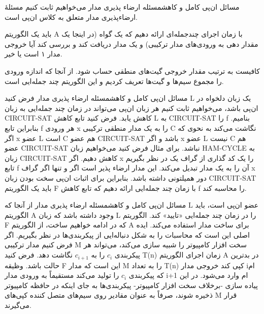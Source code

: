 \begin{itemframe-s}{مسائل ان‌پی کامل و کاهش}{مسئله ارضاء پذیری مدار}
\itm
می‌خواهیم ثابت کنیم مسئلهٔ ارضاء‌پذیری مدار متعلق به کلاس ان‌پی است.

\itm
باید یک الگوریتم A با زمان اجرای چندجمله‌ای ارائه ‌دهیم که یک گواه (در اینجا یک مقدار دهی به ورودی‌های مدار ترکیبی) و یک مدار دریافت کند و بررسی کند آیا خروجی مدار ۱ است یا خیر.

\itm
کافیست به ترتیب مقدار خروجی گیت‌های منطقی حساب شود. از آنجا که اندازه ورودی را مجموع سیم‌ها و گیت‌ها تعریف کردیم و این الگوریتم چند جمله‌ایی است.
\end{itemframe-s}

\begin{itemframe-s}{مسائل ان‌پی کامل و کاهش}{مسئله ارضاء پذیری مدار}
\itm
فرض کنید L یک زبان دلخواه در ان‌پی باشد، می‌خواهیم ثابت کنیم هر زبان ان‌پی می‌تواند در زمان چند جمله‌ایی به زبان CIRCUIT-SAT کاهش یابد. فرض کنید تابع کاهش L به CIRCUIT-SAT را f بنامیم.
\itm
بنابراین تابع f هر ورودی x را به یک مدار منطقی ترکیبی C نگاشت می‌کند به نحوی که اگر x عضو L است C هم عضو CIRCUIT-SAT باشد و اگر x عضو L نیست C هم عضو CIRCUIT-SAT نباشد.
\itm
برای مثال فرض کنید می‌خواهیم زبان HAM-CYCLE به زبان CIRCUIT-SAT کاهش دهیم. اگر x را یک کد گذاری از گراف یک در نظر بگیریم تابع f آن را به یک مدار تبدیل می‌کند. این مدار ارضاء پذیر است اگر و تنها اگر گراف x دور همیلتونی داشته باشد.
\itm
بنابراین برای اثبات ان‌پی سخت بودن زبان CIRCUIT-SAT باید یک الگوریتم F با زمان چند جمله‌ایی ارائه دهیم که تابع کاهش f را محاسبه کند.
\end{itemframe-s}

\begin{itemframe-s}{مسائل ان‌پی کامل و کاهش}{مسئله ارضاء پذیری مدار}
\itm
از آنجا که L عضو ان‌پی است، باید الگوریتم A وجود داشته باشد که زبان L را در زمان چند جمله‌ایی «تایید» کند. الگوریتم F که در ادامه خواهیم ساخت، از الگوریتم A برای ساخت مدار استفاده می‌کند.
\itm
ایده اصلی این است که محاسبات را به شکل دنباله‌ایی از پیکربندی‌ها در نظر بگیریم. اگر فرض کنیم مدار ترکیبی M سخت افزار کامپیوتر را شبیه سازی می‌کند، می‌تواند هر پیکربندی $c_i$ را به $ c_{i+1}$ نگاشت دهد.
\itm
فرض کنید T(n) زمان اجرای الگوریتم A  در بدترین حالت باشد. وظیقه F این است که مدار M را به تعداد T(n) کپی کند خروجی مدار iام که پیکربندی $c_i$ را تولید می‌کند مستقیماً به ورودی مدار i+1 ام وارد می‌شود.
\itm
در این پیاده سازی -برخلاف سخت افزار کامپیوتر- پیکربندی‌ها به جای اینکه در حافظه کامپیوتر ذخیره شوند، صرفاً به عنوان مقادیر روی سیم‌های متصل کننده کپی‌های M قرار می‌گیرند.
\end{itemframe-s}

